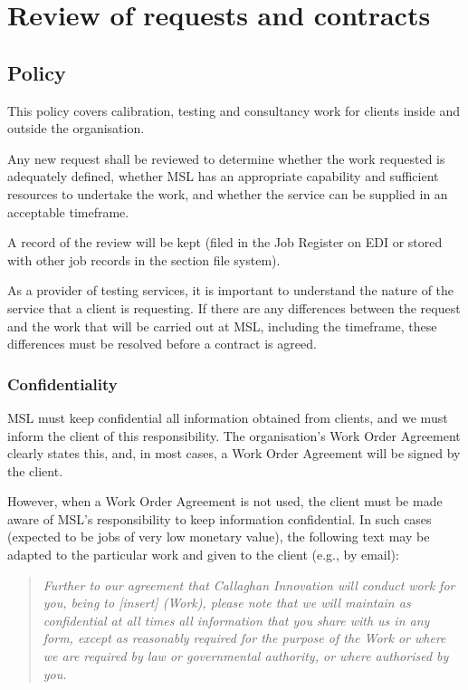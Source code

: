 \section{Review of requests and contracts}
\label{s:requests_and_tenders}
\subsection{Policy}
This policy covers calibration, testing and consultancy work for clients inside and outside the organisation.

Any new request shall be reviewed to determine whether the work requested is adequately defined, whether MSL has an appropriate capability and sufficient resources to undertake the work, and whether the service can be supplied in an acceptable timeframe.

A record of the review will be kept (filed in the Job Register on EDI or stored with other job records in the section file system).

As a provider of testing services, it is important to understand the nature of the service that a client is requesting. If there are any differences between the request and the work that will be carried out at MSL, including the timeframe, these differences must be resolved before a contract is agreed.

\subsubsection{Confidentiality}
\label{sss:confidentiality}
MSL must keep confidential all information obtained from clients, and we must inform the client of this responsibility. The organisation’s Work Order Agreement clearly states this, and, in most cases, a Work Order Agreement will be signed by the client. 

However, when a Work Order Agreement is not used, the client must be made aware of MSL’s responsibility to keep information confidential. In such cases (expected to be jobs of very low monetary value), the following text may be adapted to the particular work and given to the client (e.g., by email):
\begin{quote}
\textit{Further to our agreement that Callaghan Innovation will conduct work for you, being to [insert] (Work), please note that we will maintain as confidential at all times all information that you share with us in any form, except as reasonably required for the purpose of the Work or where we are required by law or governmental authority, or where authorised by you.}
\end{quote}



